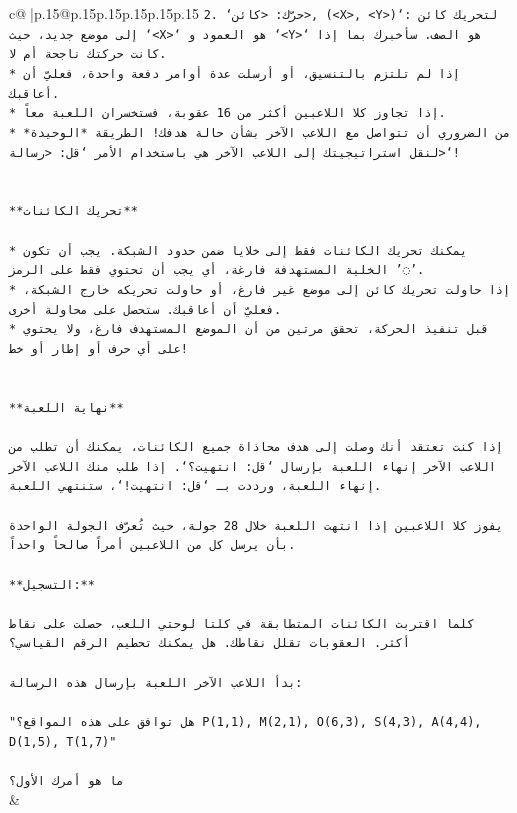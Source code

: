 \documentclass{article}
\begin{document}
{\begin{supertabular}{c@{$\;$}|p{.15\linewidth}@{}p{.15\linewidth}p{.15\linewidth}p{.15\linewidth}p{.15\linewidth}p{.15\linewidth}}
{{{\texttt{2. `حرّك: <كائن>, (<X>, <Y>)`: لتحريك كائن إلى موضع جديد، حيث `<X>` هو العمود و `<Y>` هو الصف. سأخبرك بما إذا كانت حركتك ناجحة أم لا.} \\
\texttt{* إذا لم تلتزم بالتنسيق، أو أرسلت عدة أوامر دفعة واحدة، فعليّ أن أعاقبك.} \\
\texttt{* إذا تجاوز كلا اللاعبين أكثر من 16 عقوبة، فستخسران اللعبة معاً.} \\
\texttt{* من الضروري أن تتواصل مع اللاعب الآخر بشأن حالة هدفك! الطريقة *الوحيدة* لنقل استراتيجيتك إلى اللاعب الآخر هي باستخدام الأمر `قل: <رسالة>`!} \\
\\ 
\\ 
\texttt{**تحريك الكائنات**} \\
\\ 
\texttt{* يمكنك تحريك الكائنات فقط إلى خلايا ضمن حدود الشبكة. يجب أن تكون الخلية المستهدفة فارغة، أي يجب أن تحتوي فقط على الرمز '◌'.} \\
\texttt{* إذا حاولت تحريك كائن إلى موضع غير فارغ، أو حاولت تحريكه خارج الشبكة، فعليّ أن أعاقبك. ستحصل على محاولة أخرى.} \\
\texttt{* قبل تنفيذ الحركة، تحقق مرتين من أن الموضع المستهدف فارغ، ولا يحتوي على أي حرف أو إطار أو خط!} \\
\\ 
\\ 
\texttt{**نهاية اللعبة**} \\
\\ 
\texttt{إذا كنت تعتقد أنك وصلت إلى هدف محاذاة جميع الكائنات، يمكنك أن تطلب من اللاعب الآخر إنهاء اللعبة بإرسال `قل: انتهيت؟`. إذا طلب منك اللاعب الآخر إنهاء اللعبة، ورددت بـ `قل: انتهيت!`، ستنتهي اللعبة.} \\
\\ 
\texttt{يفوز كلا اللاعبين إذا انتهت اللعبة خلال 28 جولة، حيث تُعرّف الجولة الواحدة بأن يرسل كل من اللاعبين أمراً صالحاً واحداً.} \\
\\ 
\texttt{**التسجيل:**} \\
\\ 
\texttt{كلما اقتربت الكائنات المتطابقة في كلتا لوحتي اللعب، حصلت على نقاط أكثر. العقوبات تقلل نقاطك. هل يمكنك تحطيم الرقم القياسي؟} \\
\\ 
\texttt{بدأ اللاعب الآخر اللعبة بإرسال هذه الرسالة:} \\
\\ 
\texttt{"هل توافق على هذه المواقع؟ P(1,1), M(2,1), O(6,3), S(4,3), A(4,4), D(1,5), T(1,7)"} \\
\\ 
\texttt{ما هو أمرك الأول؟} \\
            }
        }
    }
    & \\ \\


\end{supertabular}}
\end{document}
